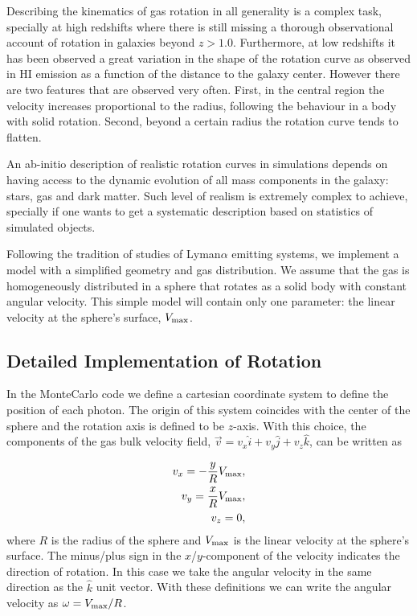 \documentclass[usenatbib]{mn2e}
\begin{document}
Describing the kinematics of gas rotation in all generality is a
complex task, specially at high redshifts where there is still missing
a thorough observational account of rotation in galaxies beyond
$z>1.0$. Furthermore, at low redshifts it has been observed a great
variation in the shape of the rotation curve as observed in HI
emission as a function of the distance to the galaxy center. However
there are two features that are observed very often. First, in the
central region the velocity increases proportional to the radius,
following the behaviour in a body with solid rotation. Second, beyond
a certain radius the rotation curve tends to flatten. 

An ab-initio description of realistic rotation curves in simulations
depends on having access to the dynamic evolution of all mass components
in the galaxy: stars, gas and dark matter. Such level of realism is
extremely complex to achieve, specially if one wants to get a
systematic description based on statistics of simulated objects.

Following the tradition of studies of Lyman$\alpha$ emitting systems,
we implement a model with a simplified geometry and gas
distribution. We assume that the gas is homogeneously distributed in a
sphere that rotates as a solid body with constant angular
velocity. This simple model will contain only one parameter: the
linear velocity at the sphere's surface, $V_{\rm max}$.

\subsection{Detailed Implementation of Rotation}

 In the MonteCarlo code we define a cartesian coordinate system to
 define the position of each photon. The origin of this system
 coincides with the center of the sphere and the rotation axis is defined
 to be $z$-axis. With this choice, the components of the gas bulk velocity
 field, $\vec{v} = v_{x}\hat{i} + v_{y}\hat{j} + v_{z}\hat{k}$, can be
 written as  
  
\begin{subequations}
\begin{align}
    v_{x}=-\dfrac{y}{R}V_{\rm max}, \label{subeq1}\\
    v_{y}=\dfrac{x}{R}V_{\rm max}, \label{subeq2}\\
    v_{z}=0, \label{subeq3}
\end{align}
\end{subequations}
%
where $R$ is the radius of the sphere and $V_{\rm max}$ is the linear
velocity at the sphere's surface. The minus/plus sign in the
$x$/$y$-component of the velocity indicates the direction of
rotation. In this case we take the angular velocity in the same
direction as the $\hat{k}$ unit vector. With these definitions we can
write the angular velocity as $\omega=V_{\rm max}/R$.  
\end{document}
